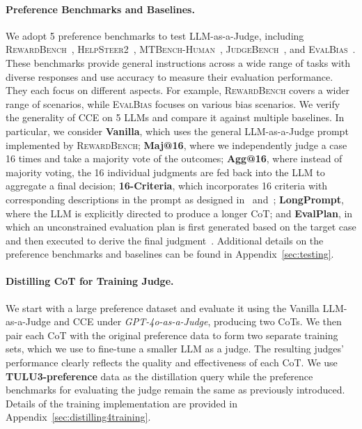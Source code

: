 \paragraph{Preference Benchmarks and Baselines.} We adopt 5 preference benchmarks to test LLM-as-a-Judge, including \textsc{RewardBench}~\citep{lambert2024rewardbench}, \textsc{HelpSteer2}~\citep{wang2024helpsteer}, \textsc{MTBench-Human}~\citep{zheng2023mtbench}, \textsc{JudgeBench}~\citep{tan2025judgebench}, and \textsc{EvalBias}~\citep{park2024offsetbias}. These benchmarks provide general instructions across a wide range of tasks with diverse responses and use accuracy to measure their evaluation performance. They each focus on different aspects. For example, \textsc{RewardBench} covers a wider range of scenarios, while \textsc{EvalBias} focuses on various bias scenarios. We verify the generality of \textsc{CCE} on 5 LLMs and compare it against multiple baselines. In particular, we consider \textbf{Vanilla}, which uses the general LLM-as-a-Judge prompt implemented by \textsc{RewardBench}; \textbf{Maj@16}, where we independently judge a case 16 times and take a majority vote of the outcomes; \textbf{Agg@16}, where instead of majority voting, the 16 individual judgments are fed back into the LLM to aggregate a final decision; \textbf{16-Criteria}, which incorporates 16 criteria with corresponding descriptions in the prompt as designed in~\citet{hu2024arellm} and~\citet{wang2024helpsteer}; \textbf{LongPrompt}, where the LLM is explicitly directed to produce a longer CoT; and \textbf{EvalPlan}, in which an unconstrained evaluation plan is first generated based on the target case and then executed to derive the final judgment~\citep{saha2025learningplanreason}. Additional details on the preference benchmarks and baselines can be found in Appendix~\ref{sec:testing}.





\paragraph{Distilling CoT for Training Judge.} We start with a large preference dataset and evaluate it using the Vanilla LLM-as-a-Judge and \textsc{CCE} under \textit{GPT-4o-as-a-Judge}, producing two CoTs. We then pair each CoT with the original preference data to form two separate training sets, which we use to fine-tune a smaller LLM as a judge. The resulting judges’ performance clearly reflects the quality and effectiveness of each CoT. We use \textbf{TULU3-preference} data as the distillation query while the preference benchmarks for evaluating the judge remain the same as previously introduced. Details of the training implementation are provided in Appendix~\ref{sec:distilling4training}.

